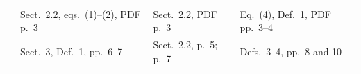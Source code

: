 {\begin{longtable}{@{}p{}p{}p{}p{}@{}}
            \cite{KettmannHS25}         & Sect.~2.2, eqs.~(1)--(2), PDF p.~3                    & Sect.~2.2, PDF p.~3                             & Eq.~(4), Def.~1, PDF pp.~3--4                                      \\
            \cite{KettmannSHS26arxiv}   & Sect.~3, Def.~1, pp.~6--7                             & Sect.~2.2, p.~5; p.~7                           & Defs.~3--4, pp.~8 and 10                                           \\
        \end{longtable}
    }
\endgroup
